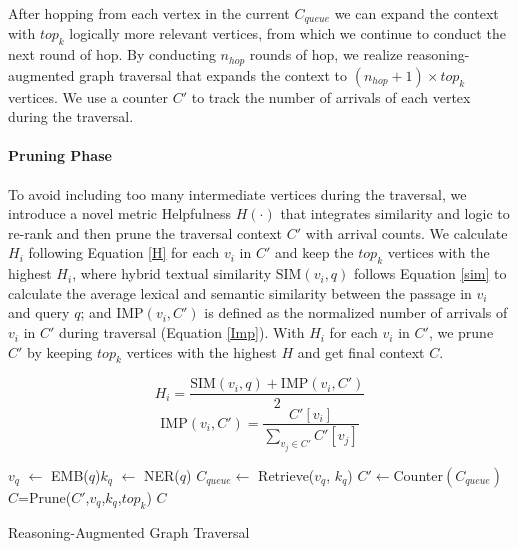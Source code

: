 After hopping from each vertex in the current $C_{queue}$ we can expand the context with $top_k$ logically more relevant vertices, from which we continue to conduct the next round of hop. By conducting $n_{hop}$ rounds of hop, we realize reasoning-augmented graph traversal that expands the context to $(n_{hop}+1)\times top_k$ vertices. We use a counter $C'$ to track the number of arrivals of each vertex during the traversal.

\paragraph{Pruning Phase} To avoid including too many intermediate vertices during the traversal, we introduce a novel metric Helpfulness $H(\cdot)$  that integrates similarity and logic to re-rank and then prune the traversal context $C'$ with arrival counts. We calculate $H_i$ following Equation \ref{H} for each $v_i$ in $C'$ and keep the $top_k$ vertices with the highest $H_i$, where hybrid textual similarity $\text{SIM}(v_i, q)$ follows Equation \ref{sim} to calculate the average lexical and semantic similarity between the passage in $v
_i$ and query $q$; and $\text{IMP}(v_i,C')$ is defined as the normalized number of arrivals of $v_i$ in $C'$ during traversal (Equation \ref{Imp}). With $H_i$ for each $v_i$ in $C'$, we prune $C'$ by keeping $top_k$ vertices with the highest $H$ and get final context $C$.

\begin{equation}
    H_i=\frac{\text{SIM}(v_i, q)+\text{IMP}(v_i,C')}{2}
    \label{H}
\end{equation}
\begin{equation}
    \text{IMP}(v_i, C') = \frac{C'[v_i]}{\sum_{v_j \in C'} C'[v_j]}
    \label{Imp}
\end{equation}
\begin{algorithm}
  \SetAlgoLined
 $v_{q}$ $\leftarrow$ EMB($q$)\;$  k_{q}$ $\leftarrow$ NER($q$)\;
  $C_{queue}\leftarrow$ Retrieve($v_{q}$, $k_{q}$)\;
  $C'\leftarrow $Counter$(C_{queue})$\;
  $C$=Prune($C'$,$v_{q}$,$k_q$,$top_k$)\;
  \Return $C$
  \caption{Reasoning-Augmented Graph Traversal}
  \label{ragt}
\end{algorithm}
